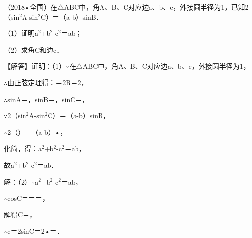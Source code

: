 \begin{question}
（2018•全国）在$\triangle$ABC中，角A、B、C对应边a、b、c，外接圆半径为1，已知2（sin$^{2}$A-sin$^{2}$C）＝（a-b）sinB．\par
（1）证明a$^{2}$+b$^{2}$-c$^{2}$＝ab；\par
（2）求角C和边c．\par
\begin{solution}
【解答】证明：（1）$\because$在$\triangle$ABC中，角A、B、C对应边a、b、c，外接圆半径为1，\par
$\therefore$由正弦定理得：\allowbreak{}＝2R＝2，\par
$\therefore$sinA＝\allowbreak{}，sinB＝\allowbreak{}，sinC＝\allowbreak{}，\par
$\because$2（sin$^{2}$A-sin$^{2}$C）＝（a-b）sinB，\par
$\therefore$2（\allowbreak{}）＝（a-b）•\allowbreak{}，\par
化简，得：a$^{2}$+b$^{2}$-c$^{2}$＝ab，\par
故a$^{2}$+b$^{2}$-c$^{2}$＝ab．\par
解：（2）$\because$a$^{2}$+b$^{2}$-c$^{2}$＝ab，\par
$\therefore$cosC＝\allowbreak{}＝\allowbreak{}＝\allowbreak{}，\par
解得C＝\allowbreak{}，\par
$\therefore$c＝2sinC＝2•\allowbreak{}＝\allowbreak{}．\par
\end{solution}
\end{question}

